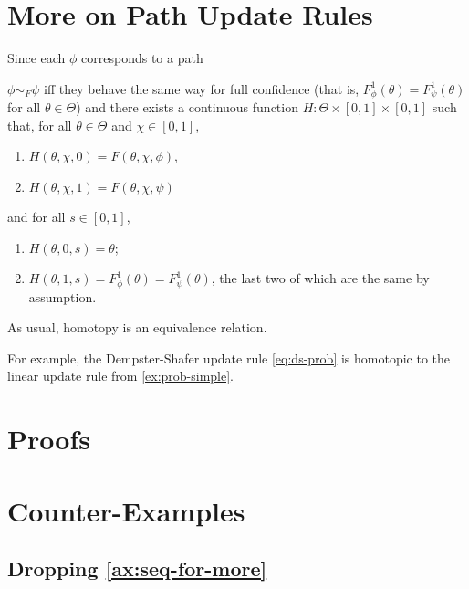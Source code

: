 \section{More on Path Update Rules}
Since each $\phi$ corresponds to a path

\begin{defn}
	$\phi \sim_F \psi$  iff 
	they behave the same way for full confidence (that is, 
	$F^1_{\phi}(\theta) = F^1_{\psi}(\theta)$ for all $\theta \in \Theta$)
	and  there exists a continuous function
	$H : \Theta \times [0,1] \times [0,1]$ such that,
	for all $\theta \in \Theta$ and $\chi \in [0,1]$,
	\begin{enumerate}[nosep]
		\item $H(\theta, \chi, 0)= F(\theta, \chi, \phi)$,
		\item $H(\theta, \chi, 1)= F(\theta, \chi, \psi)$
	\end{enumerate}
	and for all $s \in [0,1]$,
	\begin{enumerate}
		\item $H(\theta, 0, s) = \theta$;
		\item $H(\theta, 1, s) = F^1_{\phi}(\theta) = F^1_{\psi}(\theta)$,
		the last two of	which are the same by assumption. \qedhere
	\end{enumerate}
\end{defn}

As usual, homotopy is an equivalence relation.

For example, the Dempster-Shafer update rule \eqref{eq:ds-prob} is homotopic 
to the linear update rule from \cref{ex:prob-simple}. 


\section{Proofs}

\begin{lproof}\label{proof:add-reparam}
    
\end{lproof}


\section{Counter-Examples}

\subsection{Dropping {\cref*{ax:seq-for-more}}}


